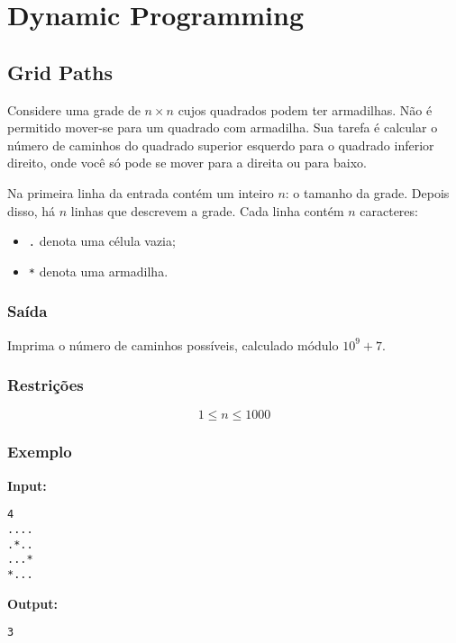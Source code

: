 \section{Dynamic Programming}
\subsection{Grid Paths}
Considere uma grade de \( n \times n \) cujos quadrados podem ter armadilhas. Não é permitido mover-se para um quadrado com armadilha. Sua tarefa é calcular o número de caminhos do quadrado superior esquerdo para o quadrado inferior direito, onde você só pode se mover para a direita ou para baixo.

Na primeira linha da entrada contém um inteiro \( n \): o tamanho da grade.  
Depois disso, há \( n \) linhas que descrevem a grade. Cada linha contém \( n \) caracteres:
\begin{itemize}
    \item \texttt{.} denota uma célula vazia;
    \item \texttt{*} denota uma armadilha.
\end{itemize}

\subsubsection*{Saída}
Imprima o número de caminhos possíveis, calculado módulo \( 10^9+7 \).

\subsubsection*{Restrições}
\[
1 \le n \le 1000
\]

\subsubsection*{Exemplo}

\textbf{Input:}
\begin{verbatim}
4
....
.*..
...*
*...
\end{verbatim}

\textbf{Output:}
\begin{verbatim}
3
\end{verbatim}

